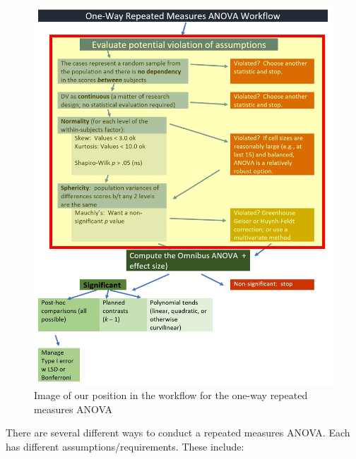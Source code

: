 \documentclass[
  11pt,
]{book}
\begin{document}
\begin{figure}
\centering
\includegraphics{images/oneway_repeated/wf_rptd_assumptions.jpg}
\caption{Image of our position in the workflow for the one-way repeated measures ANOVA}
\end{figure}

There are several different ways to conduct a repeated measures ANOVA. Each has different assumptions/requirements. These include:
\end{document}
